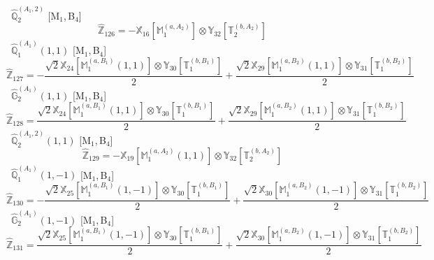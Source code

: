 \documentclass[fleqn,10pt,landscape]{article}
\begin{document}
\begin{itemize}
\begin{dmath*}
\end{dmath*}
\vspace{4mm}
\noindent {} $\,\,\,\hat{\mathbb{Q}}_{2}^{(A_{1},2)}$ [M$_{1}$,\,B$_{4}$]
\begin{dmath*}
\hat{\mathbb{Z}}_{126}=- \mathbb{X}_{16}[\mathbb{M}_{1}^{(a,A_{2})}] \otimes\mathbb{Y}_{32}[\mathbb{T}_{2}^{(b,A_{2})}]
\end{dmath*}
\vspace{4mm}
\noindent {} $\,\,\,\hat{\mathbb{Q}}_{1}^{(A_{1})}(1,1)$ [M$_{1}$,\,B$_{4}$]
\begin{dmath*}
\hat{\mathbb{Z}}_{127}=- \frac{\sqrt{2} \mathbb{X}_{24}[\mathbb{M}_{1}^{(a,B_{1})}(1,1)] \otimes\mathbb{Y}_{30}[\mathbb{T}_{1}^{(b,B_{1})}]}{2} + \frac{\sqrt{2} \mathbb{X}_{29}[\mathbb{M}_{1}^{(a,B_{2})}(1,1)] \otimes\mathbb{Y}_{31}[\mathbb{T}_{1}^{(b,B_{2})}]}{2}
\end{dmath*}
\vspace{4mm}
\noindent {} $\,\,\,\hat{\mathbb{G}}_{2}^{(A_{1})}(1,1)$ [M$_{1}$,\,B$_{4}$]
\begin{dmath*}
\hat{\mathbb{Z}}_{128}=\frac{\sqrt{2} \mathbb{X}_{24}[\mathbb{M}_{1}^{(a,B_{1})}(1,1)] \otimes\mathbb{Y}_{30}[\mathbb{T}_{1}^{(b,B_{1})}]}{2} + \frac{\sqrt{2} \mathbb{X}_{29}[\mathbb{M}_{1}^{(a,B_{2})}(1,1)] \otimes\mathbb{Y}_{31}[\mathbb{T}_{1}^{(b,B_{2})}]}{2}
\end{dmath*}
\vspace{4mm}
\noindent {} $\,\,\,\hat{\mathbb{Q}}_{2}^{(A_{1},2)}(1,1)$ [M$_{1}$,\,B$_{4}$]
\begin{dmath*}
\hat{\mathbb{Z}}_{129}=- \mathbb{X}_{19}[\mathbb{M}_{1}^{(a,A_{2})}(1,1)] \otimes\mathbb{Y}_{32}[\mathbb{T}_{2}^{(b,A_{2})}]
\end{dmath*}
\vspace{4mm}
\noindent {} $\,\,\,\hat{\mathbb{Q}}_{1}^{(A_{1})}(1,-1)$ [M$_{1}$,\,B$_{4}$]
\begin{dmath*}
\hat{\mathbb{Z}}_{130}=- \frac{\sqrt{2} \mathbb{X}_{25}[\mathbb{M}_{1}^{(a,B_{1})}(1,-1)] \otimes\mathbb{Y}_{30}[\mathbb{T}_{1}^{(b,B_{1})}]}{2} + \frac{\sqrt{2} \mathbb{X}_{30}[\mathbb{M}_{1}^{(a,B_{2})}(1,-1)] \otimes\mathbb{Y}_{31}[\mathbb{T}_{1}^{(b,B_{2})}]}{2}
\end{dmath*}
\vspace{4mm}
\noindent {} $\,\,\,\hat{\mathbb{G}}_{2}^{(A_{1})}(1,-1)$ [M$_{1}$,\,B$_{4}$]
\begin{dmath*}
\hat{\mathbb{Z}}_{131}=\frac{\sqrt{2} \mathbb{X}_{25}[\mathbb{M}_{1}^{(a,B_{1})}(1,-1)] \otimes\mathbb{Y}_{30}[\mathbb{T}_{1}^{(b,B_{1})}]}{2} + \frac{\sqrt{2} \mathbb{X}_{30}[\mathbb{M}_{1}^{(a,B_{2})}(1,-1)] \otimes\mathbb{Y}_{31}[\mathbb{T}_{1}^{(b,B_{2})}]}{2}

\end{dmath*}
\end{itemize}
\end{document}
